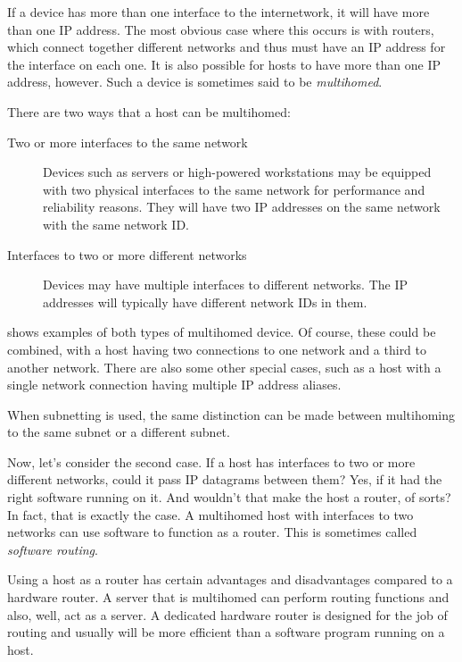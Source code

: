 If a device has more than one interface to the internetwork, it will
have more than one IP address. The most obvious case where this occurs
is with routers, which connect together different networks and thus must
have an IP address for the interface on each one. It is also possible
for hosts to have more than one IP address, however. Such a device is
sometimes said to be \emph{multihomed}.

There are two ways that a host can be multihomed:
\begin{description}
   \item[Two or more interfaces to the same network]
      Devices such as servers or high-powered workstations may be equipped with two physical interfaces to the same network for performance and reliability reasons.
      They will have two IP addresses on the same network with the same network ID.

   \item[Interfaces to two or more different networks]
      Devices may have multiple interfaces to different networks.
      The IP addresses will typically have different network IDs in them.
\end{description}


 shows examples of both types of multihomed device.
Of course, these could be combined, with a host having two connections to one network and a third to another network.
There are also some other special cases, such as a host with a single network connection having multiple IP address aliases.

\begin{note}
When subnetting is used, the same distinction can be made between multihoming to the same subnet or a different subnet.
\end{note}

Now, let's consider the second case. If a host has interfaces to two or
more different networks, could it pass IP datagrams between them? Yes,
if it had the right software
running on it. And wouldn't that make the host a router, of sorts? In
fact, that is exactly the case. A multihomed host with interfaces to two
networks can use software to function as a router. This is sometimes
called \emph{software routing}.

Using a host as a router has certain advantages and disadvantages
compared to a hardware router. A server that is multihomed can perform
routing functions and also, well, act as a server. A dedicated hardware
router is designed for the job of routing and usually will be more
efficient than a software program running on a host.


